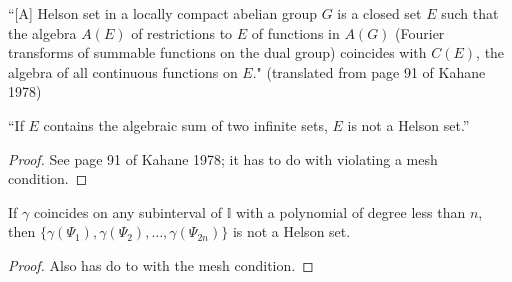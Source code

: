 \begin{definition}
  \label{def:Helson_set}
``[A] Helson set in a locally compact abelian group $G$ is a closed set $E$ such that the algebra $A(E)$ of restrictions to $E$ of functions in $A(G)$ (Fourier transforms of summable functions on the dual group) coincides with $C(E)$, the algebra of all continuous functions on $E$." (translated from page 91 of Kahane 1978) 
\end{definition}

\begin{lemma}
  \label{lem:not_Helson}
  ``If $E$ contains the algebraic sum of two infinite sets, $E$ is not a Helson set.''
\end{lemma}
\begin{proof}
  See page 91 of Kahane 1978; it has to do with violating a mesh condition.
\end{proof}

\begin{lemma}
  \label{lem:polynomial}
  If $\gamma$ coincides on any subinterval of $\mathbb{I}$ with a polynomial of degree less than $n$, then $\{\gamma\left(\Psi_1\right), \gamma\left(\Psi_2\right), \dots, \gamma\left(\Psi_{2n}\right)\}$ is not a Helson set.
\end{lemma}
\begin{proof}
  Also has do to with the mesh condition.
\end{proof}

